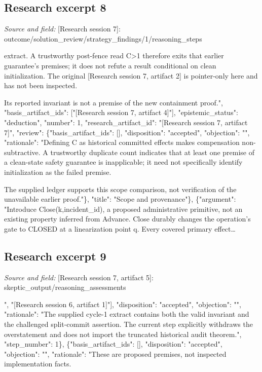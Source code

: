 \documentclass[11pt]{article}
\begin{document}
\subsection{Research excerpt 8}
\textit{Source and field: }[Research session 7]: outcome/solution\_review/strategy\_findings/1/reasoning\_steps\par
[\{"argument": "Let C(k,t) count historical committed primary effects attributed to logical operation k; it is monotone and is not reduced by refunds or corrective records. The present incident domain permits a nonzero or corrupted initial state, unlike the clean-state progress domain described in the supplied [Research session 7, artifact 4] extract. A trustworthy post-fence read C\textgreater{}1 therefore exits that earlier guarantee's premises; it does not refute a result conditional on clean initialization. The original [Research session 7, artifact 2] is pointer-only here and has not been inspected.

Its reported invariant is not a premise of the new containment proof.", "basis\_artifact\_ids": ["[Research session 7, artifact 4]"], "epistemic\_status": "deduction", "number": 1, "research\_artifact\_id": "[Research session 7, artifact 7]", "review": \{"basis\_artifact\_ids": [], "disposition": "accepted", "objection": "", "rationale": "Defining C as historical committed effects makes compensation non-subtractive. A trustworthy duplicate count indicates that at least one premise of a clean-state safety guarantee is inapplicable; it need not specifically identify initialization as the failed premise.

The supplied ledger supports this scope comparison, not verification of the unavailable earlier proof."\}, "title": "Scope and provenance"\}, \{"argument": "Introduce Close(k,incident\_id), a proposed administrative primitive, not an existing property inferred from Advance. Close durably changes the operation's gate to CLOSED at a linearization point q. Every covered primary effect\ldots{}

\subsection{Research excerpt 9}
\textit{Source and field: }[Research session 7, artifact 5]: skeptic\_output/reasoning\_assessments\par
[\{"basis\_artifact\_ids": ["[Research session 7, artifact 3]", "[Research session 6, artifact 1]"], "disposition": "accepted", "objection": "", "rationale": "The supplied cycle-1 extract contains both the valid invariant and the challenged split-commit assertion. The current step explicitly withdraws the overstatement and does not import the truncated historical audit theorem.", "step\_number": 1\}, \{"basis\_artifact\_ids": [], "disposition": "accepted", "objection": "", "rationale": "These are proposed premises, not inspected implementation facts.
\end{document}
